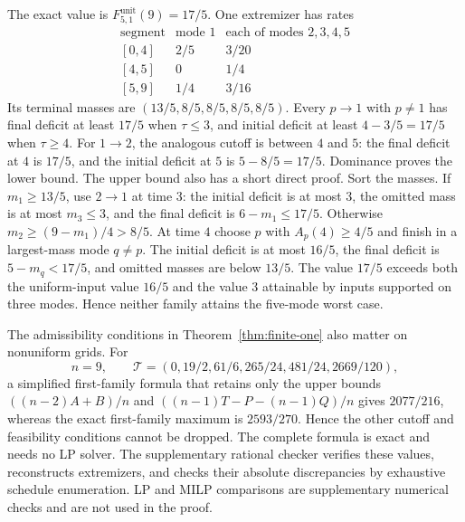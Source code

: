 \begin{example}\label{ex:five-nine}
The exact value is $F^{\mathrm{unit}}_{5,1}(9)=17/5$. One extremizer has
rates
\[
\begin{array}{c|cc}
\text{segment}&\text{mode }1&\text{each of modes }2,3,4,5\\\hline
{[0,4]}&2/5&3/20\\
{[4,5]}&0&1/4\\
{[5,9]}&1/4&3/16
\end{array}
\]
Its terminal masses are $(13/5,8/5,8/5,8/5,8/5)$.
Every $p\to1$ with $p\ne1$ has final deficit at least $17/5$ when
$\tau\le3$, and initial deficit at least $4-3/5=17/5$ when $\tau\ge4$.
For $1\to2$, the analogous cutoff is between $4$ and $5$:
the final deficit at $4$ is $17/5$, and the initial deficit at $5$ is
$5-8/5=17/5$. Dominance proves the lower bound.
The upper bound also has a short direct proof. Sort the masses. If
$m_1\ge13/5$, use $2\to1$ at time $3$: the initial deficit is at most
$3$, the omitted mass is at most $m_3\le3$, and the final deficit is
$6-m_1\le17/5$. Otherwise $m_2\ge(9-m_1)/4>8/5$.
At time $4$ choose $p$ with $A_p(4)\ge4/5$ and finish in a largest-mass
mode $q\ne p$. The initial deficit is at most $16/5$, the final deficit
is $5-m_q<17/5$, and omitted masses are below $13/5$.
The value $17/5$ exceeds both the uniform-input value $16/5$ and the value
$3$ attainable by inputs supported on three modes. Hence neither family
attains the five-mode worst case.
\end{example}

The admissibility conditions in Theorem~\ref{thm:finite-one} also matter
on nonuniform grids. For
\[
 n=9,\qquad
 \mathcal T=(0,19/2,61/6,265/24,481/24,2669/120),
\]
a simplified first-family formula that retains only the upper bounds
$((n-2)A+B)/n$ and $((n-1)T-P-(n-1)Q)/n$ gives $2077/216$,
whereas the exact first-family maximum is $2593/270$.
Hence the other cutoff and feasibility conditions cannot be dropped.
The complete formula is exact and needs no LP solver. The supplementary
rational checker verifies these values, reconstructs extremizers, and
checks their absolute discrepancies by exhaustive schedule enumeration.
LP and MILP comparisons are supplementary numerical checks and are not
used in the proof.
